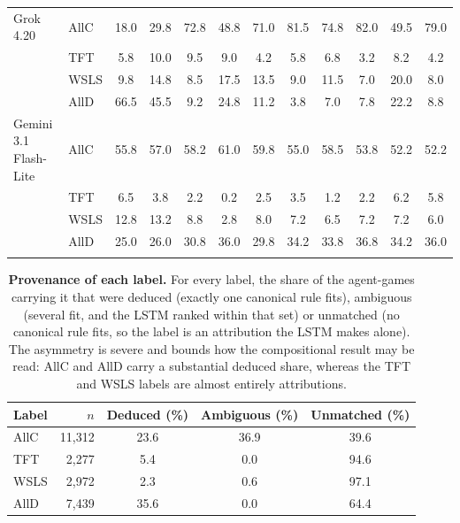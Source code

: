 \documentclass[11pt,a4paper]{article}
\begin{document}
\begin{table}[htbp]
{\begin{tabular}{@{}llcccccccccc@{}}
\addlinespace
Grok 4.20 & AllC & 18.0 & 29.8 & 72.8 & 48.8 & 71.0 & 81.5 & 74.8 & 82.0 & 49.5 & 79.0 \\
 & TFT & 5.8 & 10.0 & 9.5 & 9.0 & 4.2 & 5.8 & 6.8 & 3.2 & 8.2 & 4.2 \\
 & WSLS & 9.8 & 14.8 & 8.5 & 17.5 & 13.5 & 9.0 & 11.5 & 7.0 & 20.0 & 8.0 \\
 & AllD & 66.5 & 45.5 & 9.2 & 24.8 & 11.2 & 3.8 & 7.0 & 7.8 & 22.2 & 8.8 \\
\addlinespace
Gemini 3.1 Flash-Lite & AllC & 55.8 & 57.0 & 58.2 & 61.0 & 59.8 & 55.0 & 58.5 & 53.8 & 52.2 & 52.2 \\
 & TFT & 6.5 & 3.8 & 2.2 & 0.2 & 2.5 & 3.5 & 1.2 & 2.2 & 6.2 & 5.8 \\
 & WSLS & 12.8 & 13.2 & 8.8 & 2.8 & 8.0 & 7.2 & 6.5 & 7.2 & 7.2 & 6.0 \\
 & AllD & 25.0 & 26.0 & 30.8 & 36.0 & 29.8 & 34.2 & 33.8 & 36.8 & 34.2 & 36.0 \\
\addlinespace
\bottomrule
\end{tabular}
}
\end{table}

\begin{table}[htbp]
\centering
\footnotesize
\setlength{\tabcolsep}{4pt}
\caption{\textbf{Provenance of each label.} For every label, the share of the agent-games carrying it that were deduced (exactly one canonical rule fits), ambiguous (several fit, and the LSTM ranked within that set) or unmatched (no canonical rule fits, so the label is an attribution the LSTM makes alone). The asymmetry is severe and bounds how the compositional result may be read: AllC and AllD carry a substantial deduced share, whereas the TFT and WSLS labels are almost entirely attributions.}
\label{tab:S-provenance}
\begin{tabular}{@{}lrccc@{}}
\toprule
Label & $n$ & Deduced (\%) & Ambiguous (\%) & Unmatched (\%) \\
\midrule
AllC & 11,312 & 23.6 & 36.9 & 39.6 \\
TFT & 2,277 & 5.4 & 0.0 & 94.6 \\
WSLS & 2,972 & 2.3 & 0.6 & 97.1 \\
AllD & 7,439 & 35.6 & 0.0 & 64.4 \\
\bottomrule
\end{tabular}
\end{table}
\end{document}
